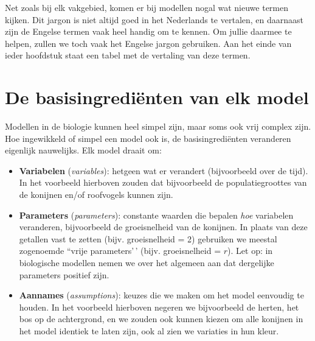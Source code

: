 \documentclass[
  a4paper,
]{scrbook}
\theoremstyle{definition}
\theoremstyle{remark}
\begin{document}
\begin{tcolorbox}[enhanced jigsaw, coltitle=black, breakable, bottomtitle=1mm, opacityback=0, colback=white, rightrule=.15mm, title=\textcolor{quarto-callout-note-color}{\faInfo}\hspace{0.5em}{Nederlands (\emph{Dutch})}, bottomrule=.15mm, toprule=.15mm, left=2mm, colframe=quarto-callout-note-color-frame, toptitle=1mm, opacitybacktitle=0.6, titlerule=0mm, colbacktitle=quarto-callout-note-color!10!white, leftrule=.75mm, arc=.35mm]

Net zoals bij elk vakgebied, komen er bij modellen nogal wat nieuwe
termen kijken. Dit jargon is niet altijd goed in het Nederlands te
vertalen, en daarnaast zijn de Engelse termen vaak heel handig om te
kennen. Om jullie daarmee te helpen, zullen we toch vaak het Engelse
jargon gebruiken. Aan het einde van ieder hoofdstuk staat een tabel met
de vertaling van deze termen.

\end{tcolorbox}

\hypertarget{de-basisingrediuxebnten-van-elk-model}{%
\section{De basisingrediënten van elk
model}\label{de-basisingrediuxebnten-van-elk-model}}

Modellen in de biologie kunnen heel simpel zijn, maar soms ook vrij
complex zijn. Hoe ingewikkeld of simpel een model ook is, de
basisingrediënten veranderen eigenlijk nauwelijks. Elk model draait om:

\begin{itemize}
\item
  \textbf{Variabelen} (\emph{variables}): hetgeen wat er verandert
  (bijvoorbeeld over de tijd). In het voorbeeld hierboven zouden dat
  bijvoorbeeld de populatiegroottes van de konijnen en/of roofvogels
  kunnen zijn.
\item
  \textbf{Parameters} (\emph{parameters}): constante waarden die bepalen
  \emph{hoe} variabelen veranderen, bijvoorbeeld de groeisnelheid van de
  konijnen. In plaats van deze getallen vast te zetten (bijv.
  groeisnelheid = 2) gebruiken we meestal zogenoemde ``vrije
  parameters'\,' (bijv. groeisnelheid = \(r\)). Let op: in biologische
  modellen nemen we over het algemeen aan dat dergelijke parameters
  positief zijn.
\item
  \textbf{Aannames} (\emph{assumptions}): keuzes die we maken om het
  model eenvoudig te houden. In het voorbeeld hierboven negeren we
  bijvoorbeeld de herten, het bos op de achtergrond, en we zouden ook
  kunnen kiezen om alle konijnen in het model identiek te laten zijn,
  ook al zien we variaties in hun kleur.
\end{itemize}
\end{document}
